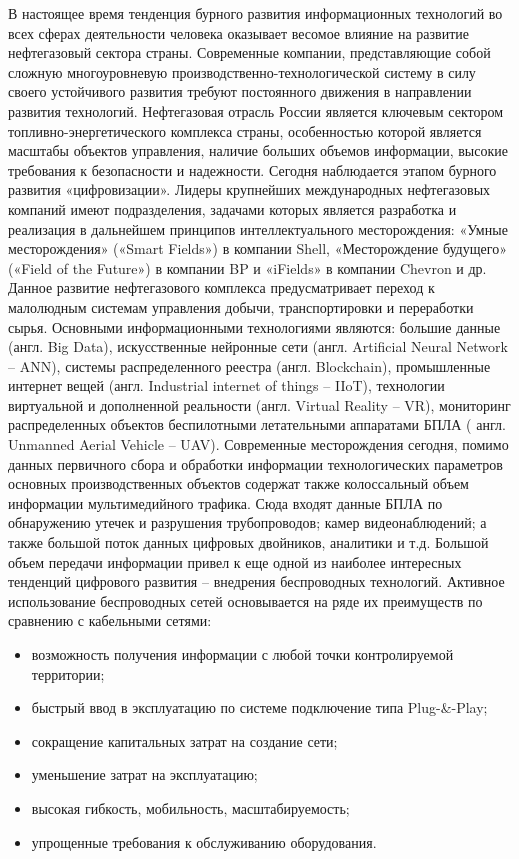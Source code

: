 
{\actuality} 
В настоящее время тенденция бурного развития информационных технологий во всех сферах деятельности человека оказывает весомое влияние на развитие нефтегазовый сектора страны. Современные компании, представляющие собой сложную многоуровневую производственно-технологической систему в силу своего устойчивого развития требуют постоянного движения в направлении развития технологий.  Нефтегазовая отрасль России является ключевым сектором топливно-энергетического комплекса страны, особенностью которой является масштабы объектов управления, наличие больших объемов информации, высокие требования к безопасности и надежности. Сегодня наблюдается этапом бурного развития «цифровизации». Лидеры крупнейших международных нефтегазовых компаний имеют подразделения, задачами которых является разработка и реализация в дальнейшем принципов интеллектуального месторождения: «Умные месторождения» («Smart Fields») в компании Shell, «Месторождение будущего» («Field of the Future») в компании BP и «iFields» в компании Chevron и др. Данное развитие нефтегазового комплекса предусматривает переход к малолюдным системам управления добычи, транспортировки и переработки сырья. Основными информационными технологиями являются: большие данные (англ. Big Data), искусственные нейронные сети (англ. Artificial Neural Network – ANN), системы распределенного реестра (англ. Blockchain), промышленные интернет вещей (англ. Industrial internet of things – IIoT), технологии виртуальной и дополненной реальности (англ. Virtual Reality – VR), мониторинг распределенных объектов беспилотными летательными аппаратами БПЛА ( англ. Unmanned Aerial Vehicle – UAV). Современные месторождения сегодня, помимо данных первичного сбора и обработки информации технологических параметров основных производственных объектов содержат также колоссальный объем  информации мультимедийного трафика. Сюда входят данные БПЛА по обнаружению утечек и  разрушения трубопроводов; камер видеонаблюдений; а также большой поток данных цифровых двойников, аналитики и т.д. Большой объем передачи информации  привел к еще одной из наиболее интересных тенденций цифрового развития – внедрения беспроводных технологий.
Активное использование беспроводных сетей основывается на ряде их преимуществ по сравнению с кабельными сетями:
\begin{itemize}
    \item возможность получения информации с любой точки контролируемой территории;
    \item быстрый ввод в эксплуатацию по системе подключение типа Plug-\&-Play;
    \item сокращение капитальных затрат на создание сети; 
    \item уменьшение затрат на эксплуатацию;
    \item высокая гибкость, мобильность, масштабируемость;
    \item упрощенные требования к обслуживанию оборудования.
\end{itemize}

